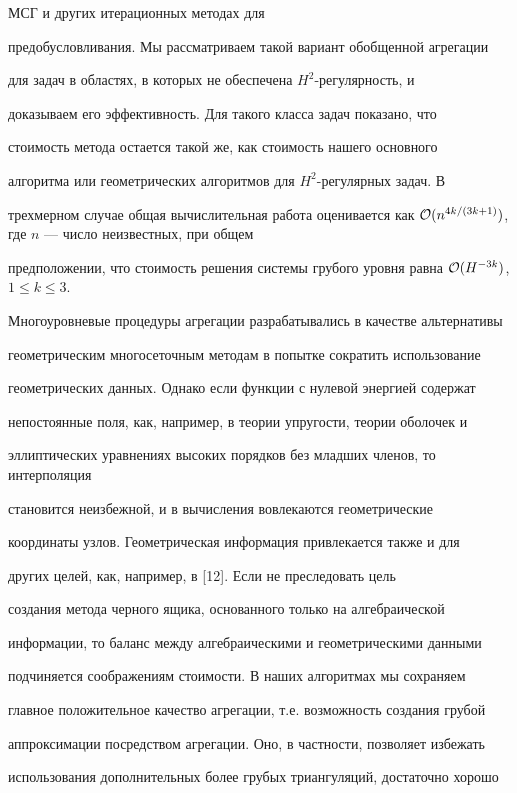 МСГ и других итерационных методах для


предобусловливания. Мы рассматриваем такой вариант обобщенной агрегации


для задач в областях, в которых не обеспечена $H^2$-регулярность, и


доказываем его эффективность. Для такого класса задач показано, что


стоимость метода остается такой же, как стоимость нашего основного


алгоритма или геометрических алгоритмов для $H^2$-регулярных задач. В


трехмерном случае общая вычислительная работа оценивается как ${\cal


O}(n^{4k/(3k+1)})$, где $n$ --- число неизвестных, при общем


предположении, что стоимость решения системы грубого уровня равна ${\cal


O}(H^{-3k})$, $1\le k\le 3$.





Многоуровневые процедуры агрегации разрабатывались в качестве альтернативы


геометрическим многосеточным методам в попытке сократить использование


геометрических данных. Однако если функции с нулевой энергией содержат


непостоянные поля, как, например, в теории упругости, теории оболочек и


эллиптических уравнениях высоких порядков без младших членов, то интерполяция


становится неизбежной, и в вычисления вовлекаются геометрические


координаты узлов. Геометрическая информация привлекается также и для


других целей, как, например, в [12]. Если не преследовать цель


создания метода черного ящика, основанного только на алгебраической


информации, то баланс между алгебраическими и геометрическими данными


подчиняется соображениям стоимости. В наших алгоритмах мы сохраняем


главное положительное качество агрегации, т.е. возможность создания грубой


аппроксимации посредством агрегации. Оно, в частности, позволяет избежать


использования дополнительных более грубых триангуляций, достаточно хорошо



